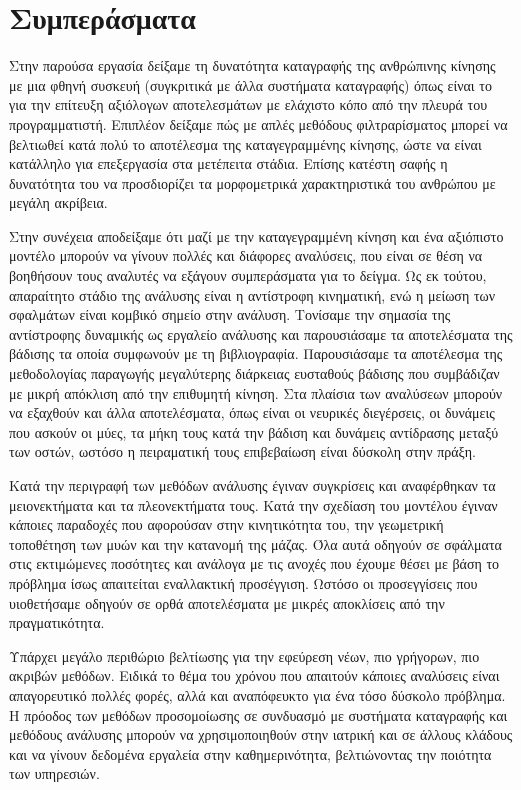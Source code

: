 \section{Συμπεράσματα}

Στην παρούσα εργασία δείξαμε τη δυνατότητα καταγραφής της ανθρώπινης κίνησης με μια φθηνή συσκευή (συγκριτικά με άλλα συστήματα καταγραφής) όπως είναι το  για την επίτευξη αξιόλογων αποτελεσμάτων με ελάχιστο κόπο από την πλευρά του προγραμματιστή. Επιπλέον δείξαμε πώς με απλές μεθόδους φιλτραρίσματος μπορεί να βελτιωθεί κατά πολύ το αποτέλεσμα της καταγεγραμμένης κίνησης, ώστε να είναι κατάλληλο για επεξεργασία στα μετέπειτα στάδια. Επίσης κατέστη σαφής η δυνατότητα του  να προσδιορίζει τα μορφομετρικά χαρακτηριστικά του ανθρώπου με μεγάλη ακρίβεια.

Στην συνέχεια αποδείξαμε ότι μαζί με την καταγεγραμμένη κίνηση και ένα αξιόπιστο μοντέλο μπορούν να γίνουν πολλές και διάφορες αναλύσεις, που είναι σε θέση να βοηθήσουν τους αναλυτές να εξάγουν συμπεράσματα για το δείγμα. Ως εκ τούτου, απαραίτητο στάδιο της ανάλυσης είναι η αντίστροφη κινηματική, ενώ η μείωση των σφαλμάτων είναι κομβικό σημείο στην ανάλυση. Τονίσαμε την σημασία της αντίστροφης δυναμικής ως εργαλείο ανάλυσης και παρουσιάσαμε τα αποτελέσματα της βάδισης τα οποία συμφωνούν με τη βιβλιογραφία. Παρουσιάσαμε τα αποτέλεσμα της μεθοδολογίας παραγωγής μεγαλύτερης διάρκειας ευσταθούς βάδισης που συμβάδιζαν με μικρή απόκλιση από την επιθυμητή κίνηση. Στα πλαίσια των αναλύσεων μπορούν να εξαχθούν και άλλα αποτελέσματα, όπως είναι οι νευρικές διεγέρσεις, οι δυνάμεις που ασκούν οι μύες, τα μήκη τους κατά την βάδιση και δυνάμεις αντίδρασης μεταξύ των οστών, ωστόσο η πειραματική τους επιβεβαίωση είναι δύσκολη στην πράξη.

Κατά την περιγραφή των μεθόδων ανάλυσης έγιναν συγκρίσεις και αναφέρθηκαν τα μειονεκτήματα και τα πλεονεκτήματα τους. Κατά την σχεδίαση του μοντέλου έγιναν κάποιες παραδοχές που αφορούσαν στην κινητικότητα του, την γεωμετρική τοποθέτηση των μυών και την κατανομή της μάζας. Όλα αυτά οδηγούν σε σφάλματα στις εκτιμώμενες ποσότητες και ανάλογα με τις ανοχές που έχουμε θέσει με βάση το πρόβλημα ίσως απαιτείται εναλλακτική προσέγγιση. Ωστόσο οι προσεγγίσεις που υιοθετήσαμε οδηγούν σε ορθά αποτελέσματα με μικρές αποκλίσεις από την πραγματικότητα.

Υπάρχει μεγάλο περιθώριο βελτίωσης για την εφεύρεση νέων, πιο γρήγορων, πιο ακριβών μεθόδων. Ειδικά το θέμα του χρόνου που απαιτούν κάποιες αναλύσεις είναι απαγορευτικό πολλές φορές, αλλά και αναπόφευκτο για ένα τόσο δύσκολο πρόβλημα. Η πρόοδος των μεθόδων προσομοίωσης σε συνδυασμό με συστήματα καταγραφής και μεθόδους ανάλυσης μπορούν να χρησιμοποιηθούν στην ιατρική και σε άλλους κλάδους και να γίνουν δεδομένα εργαλεία στην καθημερινότητα, βελτιώνοντας την ποιότητα των υπηρεσιών.
